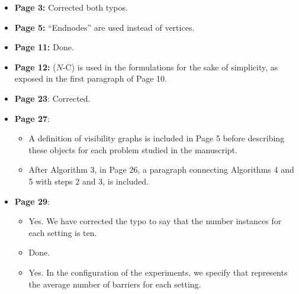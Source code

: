 \documentclass{article}
\newenvironment{reviewer}{\setcounter{pointcounter}{1}}{}
\newcommand{\point}{\text{{\selectfont \thepointcounter} \stepcounter{pointcounter}}}
\begin{document}
\begin{reviewer}
		\begin{tcolorbox}[breakable,enhanced,coltitle=black,colback=red!5!white,colframe=red!75!black,title=\textbf{Answer R1.\point},borderline={1pt}{0pt}{black},boxrule=0pt]
			\begin{itemize}
				\item \textbf{Page 3:} Corrected both typos.
				\item \textbf{Page 5:} ``Endnodes'' are used instead of vertices.
				\item \textbf{Page 11:} Done.
				\item \textbf{Page 12:} ($N$-C) is used in the formulations for the sake of simplicity, as exposed in the first paragraph of Page 10.
				\item \textbf{Page 23}: Corrected.
				\item \textbf{Page 27}: 
				\begin{itemize}
					\item A definition of visibility graphs is included in Page 5 before describing these objects for each problem studied in the manuscript.
					\item After Algorithm 3, in Page 26, a paragraph connecting Algorithms 4 and 5 with steps 2 and 3, is included.
				\end{itemize}
				\item \textbf{Page 29}:
				\begin{itemize}
					\item Yes. We have corrected the typo to say that the number instances for each setting is ten.
					\item Done.
					\item Yes. In the configuration of the experiments, we specify that  represents the average number of barriers for each setting.
				\end{itemize}
			\end{itemize}
		\end{tcolorbox}
		
	\end{reviewer}
	
\end{document}
